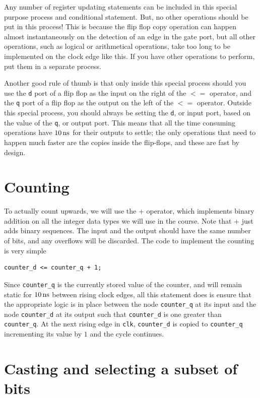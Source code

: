 \documentclass[../physical_computing.tex]{subfiles}
\begin{document}
Any number of register updating statements can be included in this special purpose process and conditional statement. But, no other operations should be put in this process! This is because the flip flop copy operation can happen almost instantaneously on the detection of an edge in the gate port, but all other operations, such as logical or arithmetical operations, take too long to be implemented on the clock edge like this. If you have other operations to perform, put them in a separate process.

Another good rule of thumb is that only inside this special process should you use the \texttt{d} port of a flip flop as the input on the right of the $<=$ operator, and the \texttt{q} port of a flip flop as the output on the left of the $<=$ operator. Outside this special process, you should always be setting the \texttt{d}, or input port, based on the value of the \texttt{q}, or output port. This means that all the time consuming operations have $\rm 10\,ns$ for their outputs to settle; the only operations that need to happen much faster are the copies inside the flip-flops, and these are fast by design.

\section{Counting}
\label{sec:counting}

To actually count upwards, we will use the $+$ operator, which implements binary addition on all the integer data types we will use in the course. Note that $+$ just adds binary sequences. The input and the output should have the same number of bits, and any overflows will be discarded. The code to implement the counting is very simple

\begin{verbatim}
counter_d <= counter_q + 1; 
\end{verbatim}

Since \texttt{counter\_q} is the currently stored value of the counter, and will remain static for $\rm 10\,ns$ between rising clock edges, all this statement does is ensure that the appropriate logic is in place between the node \texttt{counter\_q} at its input and the node \texttt{counter\_d} at its output such that \texttt{counter\_d} is one greater than \texttt{counter\_q}. At the next rising edge in \texttt{clk}, \texttt{counter\_d} is copied to \texttt{counter\_q} incrementing its value by $1$ and the cycle continues.

\section{Casting and selecting a subset of bits}
\label{sec:castandsubset}
\end{document}
